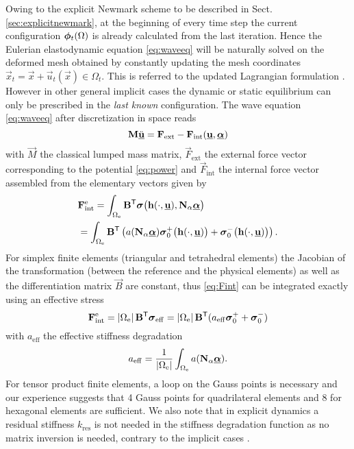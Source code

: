 Owing to the explicit Newmark scheme to be described in Sect. \ref{sec:explicitnewmark}, at the beginning of every time step the current configuration $\vphi_t(\Omega)$ is already calculated from the last iteration. Hence the Eulerian elastodynamic equation \eqref{eq:waveeq} will be naturally solved on the deformed mesh obtained by constantly updating the mesh coordinates $\vec{x}_t=\vec{x}+\vec{u}_t(\vec{x})\in\Omega_t$. This is referred to the updated Lagrangian formulation \cite{PieroLancioniMarch:2007}. However in other general implicit cases the dynamic or static equilibrium can only be prescribed in the \emph{last known} configuration. The wave equation \eqref{eq:waveeq} after discretization in space reads
\begin{equation} \label{eq:waveeqsdis}
\vec{M}\ddot{\uvec}=\vec{F}_\mathrm{ext}-\vec{F}_\mathrm{int}(\uvec,\dvec)
\end{equation}
with $\vec{M}$ the classical lumped mass matrix, $\vec{F}_\mathrm{ext}$ the external force vector corresponding to the potential \eqref{eq:power} and $\vec{F}_\mathrm{int}$ the internal force vector assembled from the elementary vectors given by
\begin{equation} \label{eq:Fint}
\begin{aligned}
& \vec{F}_\mathrm{int}^\me=\int_{\Omega_\me}\vec{B}^\mT\sig\bigl(\vec{h}(\cdot,\uvec),\vec{N}_\alpha\dvec\bigr) \\
&= \int_{\Omega_\me}\vec{B}^\mT\left(a(\vec{N}_\alpha\dvec)\sig_0^+\bigl(\vec{h}(\cdot,\uvec)\bigr)+\sig_0^-\bigl(\vec{h}(\cdot,\uvec)\bigr)\right).
\end{aligned}
\end{equation}
For simplex finite elements (triangular and tetrahedral elements) the Jacobian of the transformation (between the reference and the physical elements) as well as the differentiation matrix $\vec{B}$ are constant, thus \eqref{eq:Fint} can be integrated exactly using an effective stress
\begin{equation} \label{eq:FintSim}
\vec{F}_\mathrm{int}^\me=\abs{\Omega_\me}\vec{B}^\mT\sig_\mathrm{eff}=\abs{\Omega_\me}\vec{B}^\mT(a_\mathrm{eff}\sig_0^++\sig_0^-)
\end{equation}
with $a_\mathrm{eff}$ the effective stiffness degradation
\[
a_\mathrm{eff}=\frac{1}{\abs{\Omega_\me}}\int_{\Omega_\me}a(\vec{N}_\alpha\dvec).
\]
For tensor product finite elements, a loop on the Gauss points is necessary and our experience suggests that 4 Gauss points for quadrilateral elements and 8 for hexagonal elements are sufficient. We also note that in explicit dynamics a residual stiffness $k_\mathrm{res}$ is not needed in the stiffness degradation function as no matrix inversion is needed, contrary to the implicit cases \cite{PhamAmorMarigoMaurini:2011,SchlueterWillenbuecherKuhnMueller:2014}.

